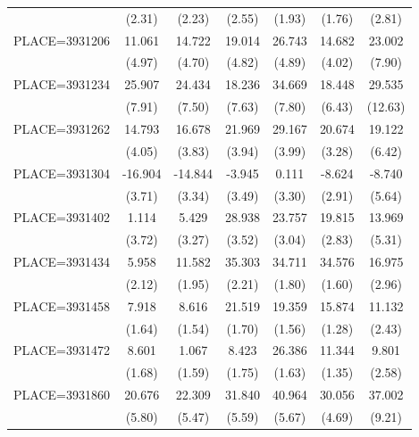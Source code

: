 {\begin{tabular}{l*{6}{c}}
                    &      (2.31)&      (2.23)&      (2.55)&      (1.93)&      (1.76)&      (2.81)\\
PLACE=3931206       &      11.061&      14.722&      19.014&      26.743&      14.682&      23.002\\
                    &      (4.97)&      (4.70)&      (4.82)&      (4.89)&      (4.02)&      (7.90)\\
PLACE=3931234       &      25.907&      24.434&      18.236&      34.669&      18.448&      29.535\\
                    &      (7.91)&      (7.50)&      (7.63)&      (7.80)&      (6.43)&     (12.63)\\
PLACE=3931262       &      14.793&      16.678&      21.969&      29.167&      20.674&      19.122\\
                    &      (4.05)&      (3.83)&      (3.94)&      (3.99)&      (3.28)&      (6.42)\\
PLACE=3931304       &     -16.904&     -14.844&      -3.945&       0.111&      -8.624&      -8.740\\
                    &      (3.71)&      (3.34)&      (3.49)&      (3.30)&      (2.91)&      (5.64)\\
PLACE=3931402       &       1.114&       5.429&      28.938&      23.757&      19.815&      13.969\\
                    &      (3.72)&      (3.27)&      (3.52)&      (3.04)&      (2.83)&      (5.31)\\
PLACE=3931434       &       5.958&      11.582&      35.303&      34.711&      34.576&      16.975\\
                    &      (2.12)&      (1.95)&      (2.21)&      (1.80)&      (1.60)&      (2.96)\\
PLACE=3931458       &       7.918&       8.616&      21.519&      19.359&      15.874&      11.132\\
                    &      (1.64)&      (1.54)&      (1.70)&      (1.56)&      (1.28)&      (2.43)\\
PLACE=3931472       &       8.601&       1.067&       8.423&      26.386&      11.344&       9.801\\
                    &      (1.68)&      (1.59)&      (1.75)&      (1.63)&      (1.35)&      (2.58)\\
PLACE=3931860       &      20.676&      22.309&      31.840&      40.964&      30.056&      37.002\\
                    &      (5.80)&      (5.47)&      (5.59)&      (5.67)&      (4.69)&      (9.21)\\

\end{tabular}}
